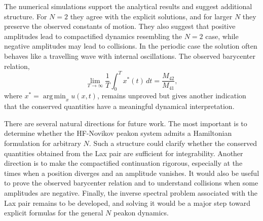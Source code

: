 \documentclass[english,master]{liumaiex}
\theoremstyle{thesisplain}
\theoremstyle{thesisdefinition}
\DeclareMathOperator*{\argmin}{arg\,min}
\numberwithin{equation}{section}
\begin{document}
The numerical simulations support the analytical results and suggest additional structure. For $N=2$ they agree with the explicit solutions, and for larger $N$ they preserve the observed constants of motion. They also suggest that positive amplitudes lead to compactified dynamics resembling the $N=2$ case, while negative amplitudes may lead to collisions. In the periodic case the solution often behaves like a travelling wave with internal oscillations. The observed barycenter relation,
\begin{equation}
	\lim_{T\to\infty}\frac{1}{T}\int_0^T x^*(t)\,dt = \frac{M_{42}}{M_{41}},
\end{equation}
where $x^*=\argmin_x u(x,t)$, remains unproved but gives another indication that the conserved quantities have a meaningful dynamical interpretation.

There are several natural directions for future work. The most important is to determine whether the HF-Novikov peakon system admits a Hamiltonian formulation for arbitrary $N$. Such a structure could clarify whether the conserved quantities obtained from the Lax pair are sufficient for integrability. Another direction is to make the compactified continuation rigorous, especially at the times when a position diverges and an amplitude vanishes. It would also be useful to prove the observed barycenter relation and to understand collisions when some amplitudes are negative. Finally, the inverse spectral problem associated with the Lax pair remains to be developed, and solving it would be a major step toward explicit formulas for the general $N$ peakon dynamics.


%
%
\newpage
\appendix
\end{document}

